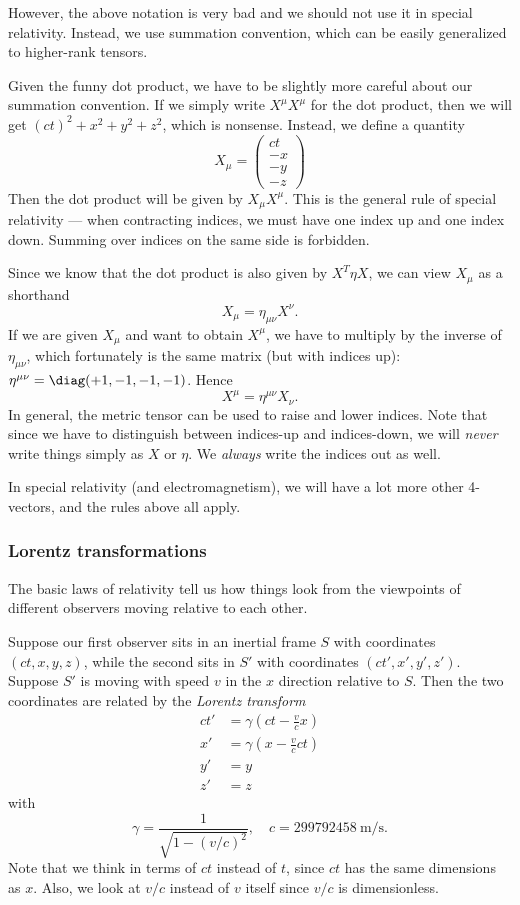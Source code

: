\documentclass[a4paper]{article}
\begin{document}
However, the above notation is very bad and we should not use it in special relativity. Instead, we use summation convention, which can be easily generalized to higher-rank tensors.

Given the funny dot product, we have to be slightly more careful about our summation convention. If we simply write $X^\mu X^\mu$ for the dot product, then we will get $(ct)^2 + x^2 + y^2 + z^2$, which is nonsense. Instead, we define a quantity
\[
  X_\mu = \begin{pmatrix}
    ct\\
    -x\\
    -y\\
    -z
  \end{pmatrix}
\]
Then the dot product will be given by $X_\mu X^\mu$. This is the general rule of special relativity --- when contracting indices, we must have one index up and one index down. Summing over indices on the same side is forbidden.

Since we know that the dot product is also given by $X^T\eta X$, we can view $X_\mu$ as a shorthand
\[
  X_\mu = \eta_{\mu\nu}X^\nu.
\]
If we are given $X_\mu$ and want to obtain $X^\mu$, we have to multiply by the inverse of $\eta_{\mu\nu}$, which fortunately is the same matrix (but with indices up): $\eta^{\mu\nu} = \diag(+1, -1, -1, -1)$. Hence
\[
  X^\mu = \eta^{\mu\nu}X_\nu.
\]
In general, the metric tensor can be used to raise and lower indices. Note that since we have to distinguish between indices-up and indices-down, we will \emph{never} write things simply as $X$ or $\eta$. We \emph{always} write the indices out as well.

In special relativity (and electromagnetism), we will have a lot more other 4-vectors, and the rules above all apply.

\subsubsection{Lorentz transformations}
The basic laws of relativity tell us how things look from the viewpoints of different observers moving relative to each other.

Suppose our first observer sits in an inertial frame $S$ with coordinates $(ct, x, y, z)$, while the second sits in $S'$ with coordinates $(ct', x', y', z')$. Suppose $S'$ is moving with speed $v$ in the $x$ direction relative to $S$. Then the two coordinates are related by the \emph{Lorentz transform}
\begin{align*}
  ct' &= \gamma\left(ct - \frac{v}{c}x\right)\\
  x' &= \gamma\left(x - \frac{v}{c}ct\right)\\
  y' &= y\\
  z' &= z
\end{align*}
with
\[
  \gamma = \frac{1}{\sqrt{1 - (v/c)^2}},\quad c = \SI{299792458}{\meter\per\second}.
\]
Note that we think in terms of $ct$ instead of $t$, since $ct$ has the same dimensions as $x$. Also, we look at $v/c$ instead of $v$ itself since $v/c$ is dimensionless.
\end{document}
